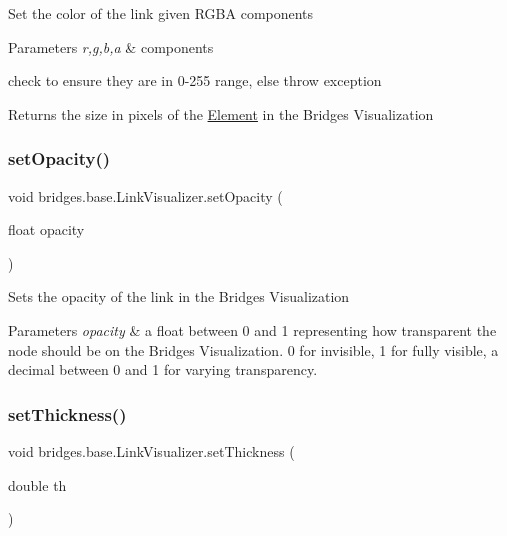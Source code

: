Set the color of the link given R\+G\+BA components


\begin{DoxyParams}{Parameters}
{\em r,g,b,a} & components\\
\hline
\end{DoxyParams}
check to ensure they are in 0-\/255 range, else throw exception

\begin{DoxyReturn}{Returns}
the size in pixels of the \hyperlink{classbridges_1_1base_1_1_element}{Element} in the Bridges Visualization 
\end{DoxyReturn}
\hypertarget{classbridges_1_1base_1_1_link_visualizer_ac0d59614dbc65ed0a19c25c493a1deaa}{}\label{classbridges_1_1base_1_1_link_visualizer_ac0d59614dbc65ed0a19c25c493a1deaa} 
\subsubsection{\texorpdfstring{set\+Opacity()}{setOpacity()}}
{\footnotesize\ttfamily void bridges.\+base.\+Link\+Visualizer.\+set\+Opacity (\begin{DoxyParamCaption}\item[{float}]{opacity }\end{DoxyParamCaption})}

Sets the opacity of the link in the Bridges Visualization


\begin{DoxyParams}{Parameters}
{\em opacity} & a float between 0 and 1 representing how transparent the node should be on the Bridges Visualization. 0 for invisible, 1 for fully visible, a decimal between 0 and 1 for varying transparency. \\
\hline
\end{DoxyParams}
\hypertarget{classbridges_1_1base_1_1_link_visualizer_a702e9ca345d1a4a035baf2041f275849}{}\label{classbridges_1_1base_1_1_link_visualizer_a702e9ca345d1a4a035baf2041f275849} 
\subsubsection{\texorpdfstring{set\+Thickness()}{setThickness()}}
{\footnotesize\ttfamily void bridges.\+base.\+Link\+Visualizer.\+set\+Thickness (\begin{DoxyParamCaption}\item[{double}]{th }\end{DoxyParamCaption})}

